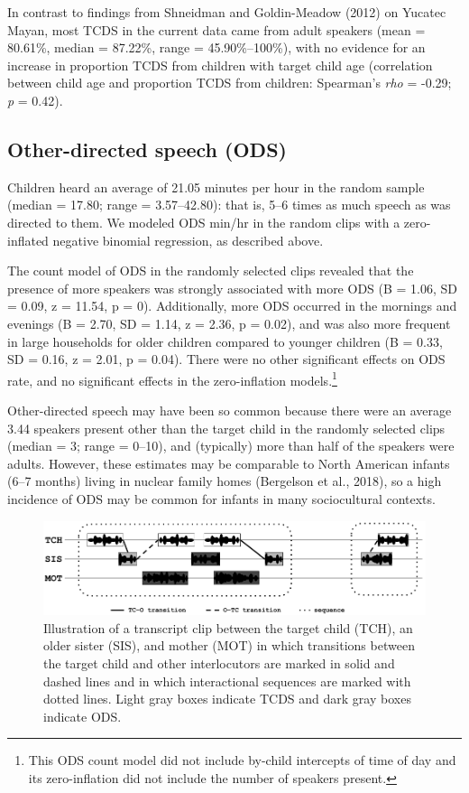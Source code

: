 \documentclass[floatsintext,man]{apa6}
\theoremstyle{definition}
\theoremstyle{definition}
\theoremstyle{definition}
\theoremstyle{remark}
\begin{document}
In contrast to findings from Shneidman and Goldin-Meadow (2012) on
Yucatec Mayan, most TCDS in the current data came from adult speakers
(mean = 80.61\%, median = 87.22\%, range = 45.90\%--100\%), with no
evidence for an increase in proportion TCDS from children with target
child age (correlation between child age and proportion TCDS from
children: Spearman's \emph{rho} = -0.29; \emph{p} = 0.42).

\subsection{Other-directed speech
(ODS)}\label{other-directed-speech-ods}

Children heard an average of 21.05 minutes per hour in the random sample
(median = 17.80; range = 3.57--42.80): that is, 5--6 times as much
speech as was directed to them. We modeled ODS min/hr in the random
clips with a zero-inflated negative binomial regression, as described
above.

The count model of ODS in the randomly selected clips revealed that the
presence of more speakers was strongly associated with more ODS (B =
1.06, SD = 0.09, z = 11.54, p = 0). Additionally, more ODS occurred in
the mornings and evenings (B = 2.70, SD = 1.14, z = 2.36, p = 0.02), and
was also more frequent in large households for older children compared
to younger children (B = 0.33, SD = 0.16, z = 2.01, p = 0.04). There
were no other significant effects on ODS rate, and no significant
effects in the zero-inflation models.\footnote{This ODS count model did
  not include by-child intercepts of time of day and its zero-inflation
  did not include the number of speakers present.}

Other-directed speech may have been so common because there were an
average 3.44 speakers present other than the target child in the
randomly selected clips (median = 3; range = 0--10), and (typically)
more than half of the speakers were adults. However, these estimates may
be comparable to North American infants (6--7 months) living in nuclear
family homes (Bergelson et al., 2018), so a high incidence of ODS may be
common for infants in many sociocultural contexts.

\begin{figure}

{\centering \includegraphics[width=1\linewidth]{Tseltal-CLE_files/TseltalCLE-TurnTimingIllustration} 

}

\caption{Illustration of a transcript clip between the target child (TCH), an older sister (SIS), and mother (MOT) in which transitions between the target child and other interlocutors are marked in solid and dashed lines and in which interactional sequences are marked with dotted lines. Light gray boxes indicate TCDS and dark gray boxes indicate ODS.}\label{fig:fig6}
\end{figure}
\end{document}

